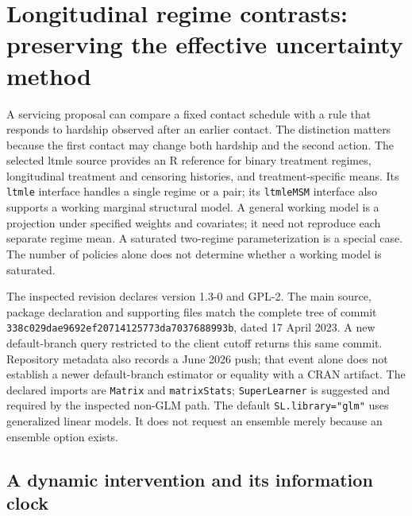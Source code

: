 \section{Longitudinal regime contrasts: preserving the effective uncertainty method}
\label{exec23:ltmle-regimes}

A servicing proposal can compare a fixed contact schedule with a rule that
responds to hardship observed after an earlier contact. The distinction matters
because the first contact may change both hardship and the second action.
The selected ltmle source provides an R reference for binary treatment regimes,
longitudinal treatment and censoring histories, and treatment-specific means.
Its \texttt{ltmle} interface handles a single regime or a pair; its
\texttt{ltmleMSM} interface also supports a working marginal structural model.
A general working model is a projection under specified weights and covariates;
it need not reproduce each separate regime mean. A saturated two-regime
parameterization is a special case. The number of policies alone does not
determine whether a working model is saturated.\citep{exec23_ltmle_source}

The inspected revision declares version 1.3-0 and GPL-2. The main source,
package declaration and supporting files match the complete tree of commit
\texttt{338c029dae9692ef20714125773da7037688993b}, dated 17 April 2023.
A new default-branch query restricted to the client cutoff returns this same
commit. Repository metadata also records a June 2026 push; that event alone
does not establish a newer default-branch estimator or equality with a CRAN
artifact. The declared imports are \texttt{Matrix} and \texttt{matrixStats};
\texttt{SuperLearner} is suggested and required by the inspected non-GLM path.
The default \texttt{SL.library="glm"} uses generalized linear models. It does
not request an ensemble merely because an ensemble option exists.
\citep{exec23_ltmle_source}

\subsection{A dynamic intervention and its information clock}

